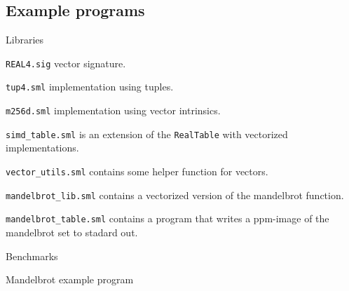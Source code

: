 \documentclass{article}
\begin{document}
\subsection{Example programs}

Libraries

\verb!REAL4.sig! vector signature.

\verb!tup4.sml! implementation using tuples.

\verb!m256d.sml! implementation using vector intrinsics.

\verb!simd_table.sml! is an extension of the \verb!RealTable! with vectorized implementations.

\verb!vector_utils.sml! contains some helper function for vectors.

\verb!mandelbrot_lib.sml! contains a vectorized version of the mandelbrot function.

\verb!mandelbrot_table.sml! contains a program that writes a ppm-image of the mandelbrot set to stadard out.

Benchmarks

Mandelbrot example program
\end{document}
